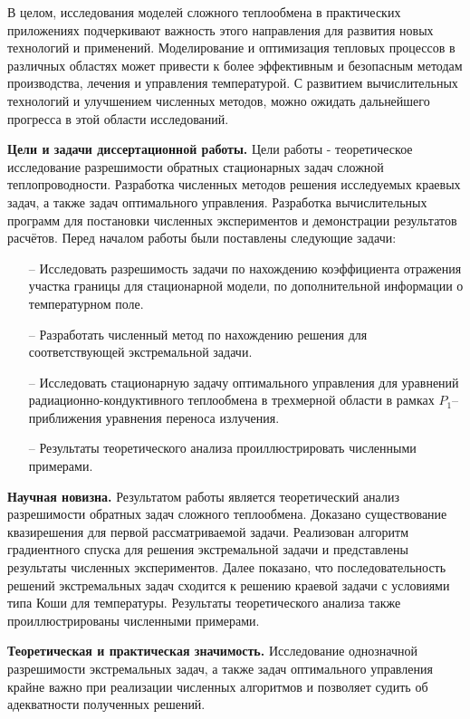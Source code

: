 В целом, исследования моделей сложного теплообмена в практических приложениях
подчеркивают важность этого направления для развития новых технологий и применений.
Моделирование и оптимизация тепловых процессов в различных областях может привести
к более эффективным и безопасным методам производства, лечения и управления температурой.
С развитием вычислительных технологий и улучшением численных методов, можно ожидать
дальнейшего прогресса в этой области исследований.


\textbf{Цели и задачи диссертационной работы.}
Цели работы - теоретическое исследование разрешимости обратных стационарных задач
сложной теплопроводности.
Разработка численных методов решения исследуемых краевых задач,
а также задач оптимального управления.
Разработка вычислительных программ для постановки численных экспериментов
и демонстрации результатов расчётов.
Перед началом работы были поставлены следующие задачи:
\begin{itemize}
  \item[--] Исследовать разрешимость задачи по нахождению коэффициента отражения участка границы для
  стационарной модели, по дополнительной информации о температурном поле.
  \item[--] Разработать численный метод по нахождению решения для соответствующей экстремальной задачи.
  \item[--] Исследовать стационарную задачу оптимального управления для уравнений радиационно-кондуктивного
  теплообмена в трехмерной области в рамках $P_1$–приближения уравнения переноса излучения.
  \item[--] Результаты теоретического анализа проиллюстрировать численными примерами.
\end{itemize}


\textbf{Научная новизна.}
Результатом работы является теоретический анализ
разрешимости обратных задач сложного теплообмена.
Доказано существование квазирешения для первой рассматриваемой задачи.
Реализован алгоритм градиентного спуска для решения экстремальной задачи и представлены результаты
численных экспериментов.
Далее показано, что последовательность решений экстремальных задач сходится к решению
краевой задачи с условиями типа Коши для температуры.
Результаты теоретического анализа также проиллюстрированы численными примерами.

\textbf{Теоретическая и практическая значимость.}
Исследование однозначной разрешимости экстремальных задач, а также задач оптимального
управления крайне важно при реализации численных алгоритмов и позволяет
судить об адекватности полученных решений.

